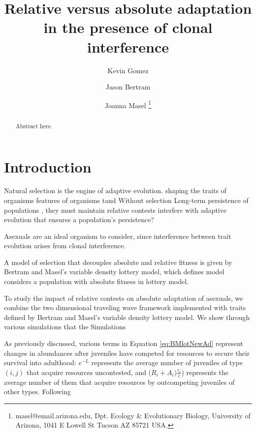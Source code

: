 \documentclass[9pt,twocolumn,twoside]{article}
\begin{document}
\title{Relative versus absolute adaptation in the presence of clonal interference}
\author[$\ast$]{Kevin Gomez}
\author[$\dagger$]{Jason Bertram}
\author[,$\ddagger$]{Joanna Masel \thanks{masel@email.arizona.edu, Dpt. Ecology \& Evolutionary Biology, University of Arizona, 1041 E Lowell St Tucson AZ 85721 USA.}}


\maketitle
\begin{abstract}
Abstract here.
\end{abstract}

\section{Introduction}
Natural selection is the engine of adaptive evolution. shaping the traits of organisms features of organisms tand  Without selection Long-term persistence of populations  , they must maintain relative contests interfere with adaptive evolution that ensures a population's persistence?

Asexuals are an ideal organism to consider, since interference between trait evolution arises from clonal interference. 

A model of selection that decouples absolute and relative fitness is given by Bertram and Masel's \citep{bertram2019density} variable density lottery model, which defines model considers a population with absolute fitness in \citet{bertram2019density} lottery model.

To study the impact of relative contests on absolute adaptation of asexuals, we combine the two dimensional traveling wave framework implemented with traits defined by Bertram and Masel's variable density lottery model. We show through various simulations that the Simulations

As previously discussed, various terms in Equation \eqref{eq:BMlotNewAd} represent changes in abundances after juveniles have competed for resources to secure their survival into adulthood: $e^{-L}$ represents the average number of juveniles of type $(i,j)$ that acquire resources uncontested, and ($R_i+ A_i) \frac{c_i}{\bar{c}}$) represents the average number of them that acquire resources by outcompeting juveniles of other types. Following
\end{document}
